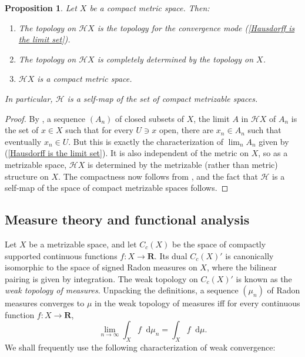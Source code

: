 \documentclass[reqno,11pt]{amsart}
\newcommand{\RR}{\mathbf{R}}
\newcommand*\dif{\mathop{}\!\mathrm{d}}
\newcommand{\Hypspace}{\mathscr H}
\newcommand{\dfn}[1]{\emph{#1}\index{#1}}
\newtheorem{proposition}[theorem]{Proposition}
\theoremstyle{definition}
\numberwithin{equation}{section}
\begin{document}
\begin{proposition}\label{Hausdorff on a CMS}
Let $X$ be a compact metric space. Then:
\begin{enumerate}
\item The topology on $\Hypspace X$ is the topology for the convergence mode (\ref{Hausdorff is the limit set}).
\item The topology on $\Hypspace X$ is completely determined by the topology on $X$.
\item $\Hypspace X$ is a compact metric space.
\end{enumerate}
In particular, $\Hypspace$ is a self-map of the set of compact metrizable spaces.
\end{proposition}
\begin{proof}
By \cite[Theorem 4.11]{nadler2017continuum}, a sequence $(A_n)$ of closed subsets of $X$, the limit $A$ in $\Hypspace X$ of $A_n$ is the set of $x \in X$ such that for every $U \ni x$ open, there are $x_n \in A_n$ such that eventually $x_n \in U$.
But this is exactly the characterization of $\lim_n A_n$ given by (\ref{Hausdorff is the limit set}).
It is also independent of the metric on $X$, so as a metrizable space, $\Hypspace X$ is determined by the metrizable (rather than metric) structure on $X$.
The compactness now follows from \cite[Theorem 4.17]{nadler2017continuum}, and the fact that $\Hypspace$ is a self-map of the space of compact metrizable spaces follows.
\end{proof}

\subsection{Measure theory and functional analysis}\label{MeasurePrelims}
Let $X$ be a metrizable space, and let $C_c(X)$ be the space of compactly supported continuous functions $f: X \to \RR$.
Its dual $C_c(X)'$ is canonically isomorphic to the space of signed Radon measures on $X$, where the bilinear pairing is given by integration.
The weak topology on $C_c(X)'$ is known as the \dfn{weak topology of measures}.
Unpacking the definitions, a sequence $(\mu_n)$ of Radon measures converges to $\mu$ in the weak topology of measures iff for every continuous function $f: X \to \RR$,
$$\lim_{n \to \infty} \int_X f \dif \mu_n = \int_X f \dif \mu.$$
We shall frequently use the following characterization of weak convergence:
\end{document}

